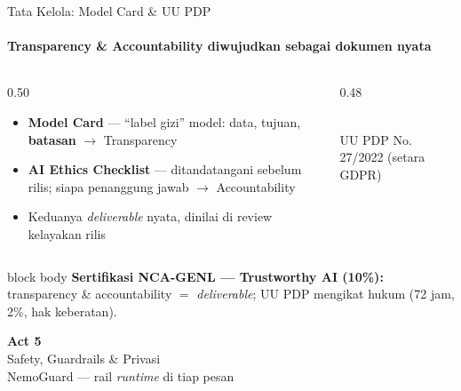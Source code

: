 \documentclass[aspectratio=169,t]{beamer}
\newcommand{\acttitle}[3]{%
  \begin{frame}[plain]
    \vspace{1.5cm}
    \begin{center}
      {\color{nvgreen}\Huge\bfseries Act #1}\\[1.2em]
      {\color{nvwhite}\Huge #2}\\[0.8em]
      {\color{nvgray}\Large #3}
    \end{center}
  \end{frame}%
}
\newcommand{\certnote}[2]{%
  \vspace{0.25em}
  \begin{beamercolorbox}[rounded=true,shadow=false,sep=5pt]{block body}
    {\scriptsize\color{nvblue}\textbf{Sertifikasi NCA-GENL --- #1:}}\,
    {\scriptsize\color{nvgray}#2}
  \end{beamercolorbox}%
}
\begin{document}
\begin{frame}{Tata Kelola: Model Card \& UU PDP}
  \framesubtitle{Transparency \& Accountability diwujudkan sebagai dokumen nyata}
  \begin{columns}[T]
    \begin{column}{0.50\textwidth}
      \begin{itemize}\footnotesize
        \item \textbf{Model Card} --- ``label gizi'' model: data, tujuan, \textbf{batasan} $\to$ Transparency
        \item \textbf{AI Ethics Checklist} --- ditandatangani sebelum rilis; siapa penanggung jawab $\to$ Accountability
        \item Keduanya \emph{deliverable} nyata, dinilai di review kelayakan rilis
      \end{itemize}
    \end{column}
    \begin{column}{0.48\textwidth}
      \begin{center}
      \\[0.3em]{\tiny\color{nvgray}UU PDP No. 27/2022 (setara GDPR)}
      \end{center}
    \end{column}
  \end{columns}
  \certnote{Trustworthy AI (10\%)}{transparency \& accountability $=$ \emph{deliverable}; UU PDP mengikat hukum (72 jam, 2\%, hak keberatan).}
\end{frame}

\acttitle{5}{Safety, Guardrails \& Privasi}{NemoGuard --- rail \emph{runtime} di tiap pesan}
\end{document}
